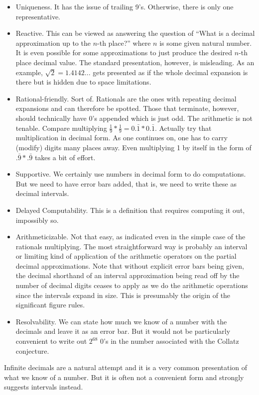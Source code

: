 \documentclass[12pt]{article}
\begin{document}
\begin{itemize}
    \item Uniqueness. It has the issue of trailing 9's. Otherwise, there is only one representative. 
    \item Reactive. This can be viewed as answering the question of ``What is a decimal approximation up to the $n$-th place?'' where $n$ is some given natural number. It is even possible for some approximations to just produce the desired $n$-th place decimal value. The standard presentation, however, is misleading. As an example, $\sqrt{2} = 1.4142...$ gets presented as if the whole decimal expansion is there but is hidden due to space limitations. 
    \item Rational-friendly. Sort of. Rationals are the ones with repeating decimal expansions and can therefore be spotted. Those that terminate, however, should technically have 0's appended which is just odd. The arithmetic is not tenable. Compare multiplying $\tfrac{1}{9}*\tfrac{1}{9} = 0.\bar{1} * 0.\bar{1}$. Actually try that multiplication in decimal form. As one continues on, one has to carry (modify) digits many places away. Even multiplying 1 by itself in the form of $.\bar{9}*.\bar{9}$ takes a bit of effort. 
    \item Supportive. We certainly use numbers in decimal form to do computations. But we need to have error bars added, that is, we need to write these as decimal intervals. 
    \item Delayed Computability. This is a definition that requires computing it out, impossibly so. 
    \item Arithmeticizable. Not that easy, as indicated even in the simple case of the rationals multiplying. The most straightforward way is probably an interval or limiting kind of application of the arithmetic operators on the partial decimal approximations. Note that without explicit error bars being given, the decimal shorthand of an interval approximation being read off by the number of decimal digits ceases to apply as we do the arithmetic operations since the intervals expand in size. This is presumably the origin of the significant figure rules. 
    \item Resolvability. We can state how much we know of a number with the decimals and leave it as an error bar. But it would not be particularly convenient to write out $2^{68}$ 0's in the number associated with the Collatz conjecture. 
\end{itemize}

Infinite decimals are a natural attempt and it is a very common presentation of what we know of a number. But it is often not a convenient form and strongly suggests intervals instead. 
\end{document}
